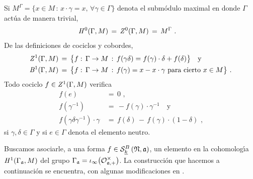 \begin{obsCohomologiaBaja}\label{obs:cohomologiabaja}
	Si
	\begin{math}
		M^{\Gamma}=\big\{x\in M\,:\,
			x\cdot\gamma=x,\,\forall\gamma\in\Gamma\big\}
	\end{math}
	denota el subm\'{o}dulo maximal en donde $\Gamma$ act\'{u}a de manera
	trivial,
	\begin{align*}
		\cohomolo[0]{\Gamma,M} & \,=\,\cociclos[0]{\Gamma,M}\,=\,
			M^{\Gamma}
		\text{ .}
	\end{align*}
	De las definiciones de cociclos y cobordes,
	\begin{align*}
		\cociclos[1]{\Gamma,M} & \,=\,\big\{
			f:\,\Gamma\rightarrow M\,:\,
				f(\gamma\delta)=f(\gamma)\cdot\delta+f(\delta)
			\big\} \quad\text{y} \\
		\cobordes[1]{\Gamma,M} & \,=\,\big\{
			f:\,\Gamma\rightarrow M\,:\,
				f(\gamma)=x-x\cdot\gamma\text{ para cierto }
				x\in M\big\}
		\text{ .}
	\end{align*}
	Todo cociclo $f\in\cociclos[1]{\Gamma,M}$ verifica
	\begin{equation}
		\label{eq:propiedadesdeloscociclos}
		\begin{aligned}
			f(e) & \,=\,0\text{ ,} \\
			f(\gamma^{-1}) & \,=\,-f(\gamma)\cdot\gamma^{-1}
				\quad\text{y} \\
			f(\gamma\delta\gamma^{-1})\cdot\gamma & \,=\,
				f(\delta) \,-\, f(\gamma)\cdot (1 - \delta)
			\text{ ,}
		\end{aligned}
	\end{equation}
	si $\gamma,\delta\in\Gamma$ y si $e\in \Gamma$ denota el elemento
	neutro.
\end{obsCohomologiaBaja}

Buscamos asociarle, a una forma $f\in\spitzH[B]{k}{\frak{N},\frak{a}}$, un
elemento en la cohomolog\'{\i}a $\cohomolo[1]{\Gamma_{\frak{a}},M}$ del grupo
$\Gamma_{\frak{a}}=\iota_{\infty}\big(\cal{O}^{\times}_{\frak{a},+}\big)$. La
construcci\'{o}n que hacemos a continuaci\'{o}n se encuentra, con algunas
modificaciones en \cite[Ch.~8]{ShimuraIntroduction}.

